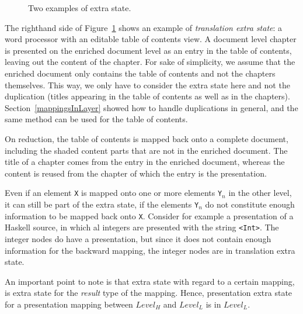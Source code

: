 \begin{figure}
\begin{center}
\begin{center}
\end{center}
\caption{Two examples of extra state.}\label{layerExtraState} 
\end{center}
\end{figure}



The righthand side of Figure~\ref{layerExtraState} shows an example of {\em translation extra state}: a word processor with an editable table of contents view. A document level chapter is presented on the enriched document level as an entry in the table of contents, leaving out the content of the chapter.  For sake of simplicity, we assume that the enriched document only contains the table of contents and not the chapters themselves. This way, we only have to consider the extra state here and not the duplication (titles appearing in the table of contents as well as in the chapters). Section~\ref{mappingsInLayer} showed how to handle duplications in general, and the same method can be used for the table of contents.

On reduction, the table of contents is mapped back onto a complete document, including the shaded content parts that are not in the enriched document. The title of a chapter comes from the entry in the enriched document, whereas the content is reused from the chapter of which the entry is the presentation. 


Even if an element \verb|X| is mapped onto one or more elements \verb|Y|$_n$  in the other level, it can still be part of the extra state, if the elements \verb|Y|$_n$ do not constitute enough information to be mapped back onto \verb|X|. Consider for example a presentation of a Haskell source, in which al integers are presented with the string \verb|<Int>|. The integer nodes do have a presentation, but since it does not contain enough information for the backward mapping, the integer nodes are in translation extra state.  

An important point to note is that extra state with regard to a certain mapping, is extra state for the {\em result} type of the mapping. Hence, presentation extra state for a presentation mapping between $Level_{H}$ and $Level_{L}$ is in $Level_{L}$.

